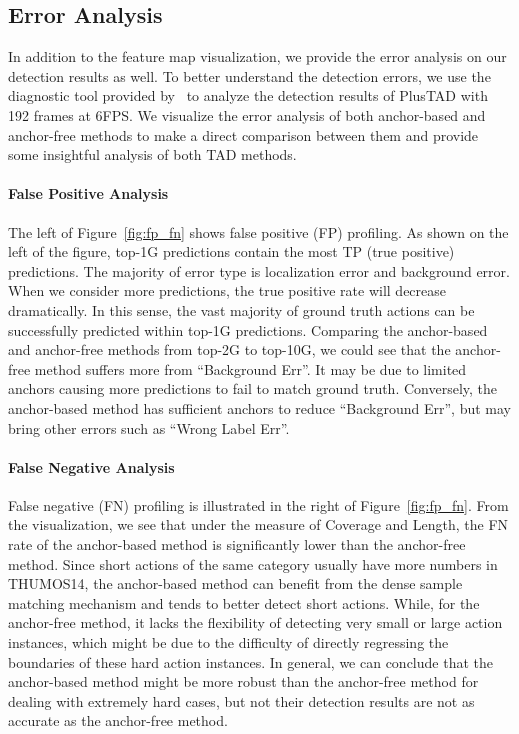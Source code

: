 \documentclass[a4paper,fleqn]{cas-dc}
\begin{document}
\subsection{Error Analysis}
In addition to the feature map visualization, we provide the error analysis on our detection results as well.
To better understand the detection errors, we use the diagnostic tool provided by~\cite{detad} to analyze the detection results of PlusTAD with 192 frames at 6FPS. 
We visualize the error analysis of both anchor-based and anchor-free methods to make a direct comparison between them and provide some insightful analysis of both TAD methods.
\paragraph{False Positive Analysis}
The left of Figure~\ref{fig:fp_fn} shows false positive (FP) profiling. 
As shown on the left of the figure, top-1G predictions contain the most TP (true positive)  predictions. The majority of error type is localization error and background error. When we consider more predictions, the true positive rate will decrease dramatically. In this sense,  the vast majority of ground truth actions can be successfully predicted within top-1G predictions. 
Comparing the anchor-based and anchor-free methods from top-2G to top-10G, we could see that the anchor-free method suffers more from ``Background Err''.
It may be due to limited anchors causing more predictions to fail to match ground truth.  
Conversely, the anchor-based method has sufficient anchors to reduce ``Background Err'', but may bring other errors such as ``Wrong Label Err''.


\paragraph{False Negative Analysis}
False negative (FN) profiling is illustrated in the right of Figure~\ref{fig:fp_fn}.
From the visualization, we see that under the measure of Coverage and Length, the FN rate of the anchor-based method is significantly lower than the anchor-free method. Since short actions of the same category usually have more numbers in THUMOS14, the anchor-based method can benefit from the dense sample matching mechanism and tends to better detect short actions. While, for the anchor-free method, it lacks the flexibility of detecting very small or large action instances, which might be due to the difficulty of directly regressing the boundaries of these hard action instances. In general, we can conclude that the anchor-based method might be more robust than the anchor-free method for dealing with extremely hard cases, but not their detection results are not as accurate as the anchor-free method.
\end{document}
